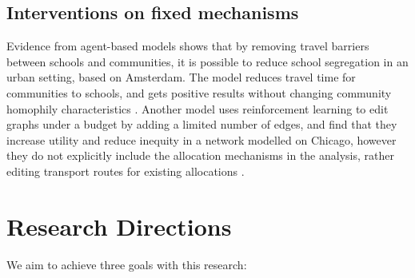 \documentclass{article}
\begin{document}
\begin{multicols}{2}
\subsection{Interventions on fixed mechanisms}
Evidence from agent-based models shows that by removing travel barriers between schools and communities, it is possible to reduce school segregation in an urban setting, based on Amsterdam. The model reduces travel time for communities to schools, and gets positive results without changing community homophily characteristics \cite{michailidisTacklingSchoolSegregation2024}. Another model uses reinforcement learning to edit graphs under a budget by adding a limited number of edges, and find that they increase utility and reduce inequity in a network modelled on Chicago, however they do not explicitly include the allocation mechanisms in the analysis, rather editing transport routes for existing allocations \cite{ramachandranGAEAGraphAugmentation2021}.



\section{Research Directions}
We aim to achieve three goals with this research:


\end{multicols}
\end{document}
